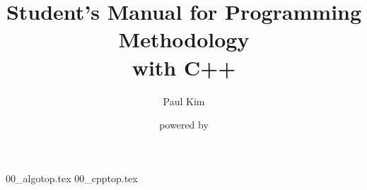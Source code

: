 \documentclass[10pt,openany,a4pper]{book}
\begin{document}
\begin{titlepage}
    \title{Student's Manual for Programming Methodology\\{\Large with C++}}
    \author{Paul Kim}
    \date{powered by \LaTeXe{}}
\maketitle
\end{titlepage}
\tableofcontents
\newpage

{00_algotop.tex}
{00_cpptop.tex}
\end{document}
